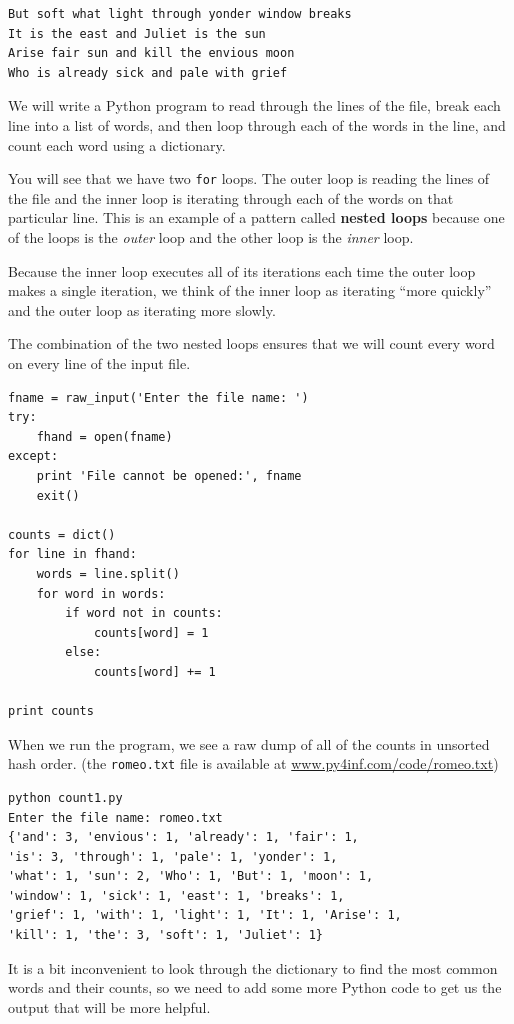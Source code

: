 \documentclass[10pt]{book}
\begin{document}
\beforeverb
\begin{verbatim}
But soft what light through yonder window breaks
It is the east and Juliet is the sun
Arise fair sun and kill the envious moon
Who is already sick and pale with grief
\end{verbatim}
\afterverb
%
We will write a Python program to read through the lines of the file, 
break each line into a list of words, and then loop through each 
of the words in the line, and count each word using a dictionary.

You will see that we have two {\tt for} loops.  The outer loop is reading the
lines of the file and the inner loop is iterating through each
of the words on that particular line.  This is an example
of a pattern called {\bf nested loops} because one of the loops
is the \emph{outer} loop and the other loop is the \emph{inner}
loop.  

Because the inner loop executes all of its iterations each time
the outer loop makes a single iteration, we think of the inner
loop as iterating ``more quickly'' and the outer loop as iterating 
more slowly.

The combination of the two nested loops ensures that we will count
every word on every line of the input file.

\beforeverb
\begin{verbatim}
fname = raw_input('Enter the file name: ')
try:
    fhand = open(fname)
except:
    print 'File cannot be opened:', fname
    exit()

counts = dict()
for line in fhand:
    words = line.split()
    for word in words:
        if word not in counts:
            counts[word] = 1
        else:
            counts[word] += 1

print counts
\end{verbatim}
\afterverb
%
When we run the program, we see a raw dump of all of the counts in unsorted
hash order.
(the {\tt romeo.txt} file is available at
\url{www.py4inf.com/code/romeo.txt})

\beforeverb
\begin{verbatim}
python count1.py 
Enter the file name: romeo.txt
{'and': 3, 'envious': 1, 'already': 1, 'fair': 1, 
'is': 3, 'through': 1, 'pale': 1, 'yonder': 1, 
'what': 1, 'sun': 2, 'Who': 1, 'But': 1, 'moon': 1, 
'window': 1, 'sick': 1, 'east': 1, 'breaks': 1, 
'grief': 1, 'with': 1, 'light': 1, 'It': 1, 'Arise': 1, 
'kill': 1, 'the': 3, 'soft': 1, 'Juliet': 1}
\end{verbatim}
\afterverb
%
It is a bit inconvenient to look through the dictionary to find the
most common words and their counts, so we need to add some more 
Python code to get us the output that will be more helpful.
\end{document}
